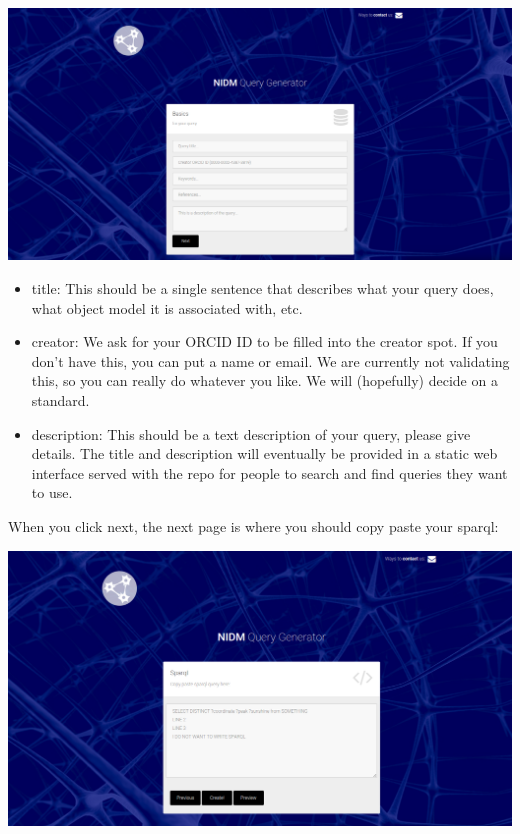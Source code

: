 \documentclass[letterpaper,10pt,english]{sphinxmanual}
\begin{document}
\includegraphics{queryField.png}
\begin{itemize}
\item {} 
title: This should be a single sentence that describes what your query does, what object model it is associated with, etc.

\item {} 
creator: We ask for your ORCID ID to be filled into the creator spot. If you don't have this, you can put a name or email. We are currently not validating this, so you can really do whatever you like. We will (hopefully) decide on a standard.

\item {} 
description: This should be a text description of your query, please give details. The title and description will eventually be provided in a static web interface served with the repo for people to search and find queries they want to use.

\end{itemize}

When you click next, the next page is where you should copy paste your sparql:

\includegraphics{querySparql.png}
\end{document}
